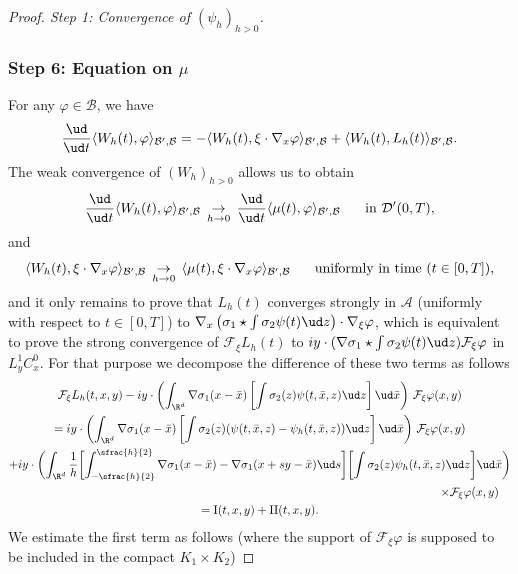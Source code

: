 \begin{proof}[Proof. Step 1: Convergence of $(\psi_{h})_{h>0}$]
\subsubsection*{Step 6: Equation on $\mu$} For any $\varphi\in\mathcal{B}$, we have
\[
\frac{\ud}{\ud t}\langle W_{h}(t),\varphi\rangle_{\mathcal{B}',\mathcal{B}}=-\langle W_{h}(t),\xi\cdot\nabla_{x}\varphi\rangle_{\mathcal{B}',\mathcal{B}}+\langle W_{h}(t),L_{h}(t)\rangle_{\mathcal{B}',\mathcal{B}}.
\]
The weak convergence of $(W_{h})_{h>0}$ allows us to obtain
\[
\frac{\ud}{\ud t}\langle W_{h}(t),\varphi\rangle_{\mathcal{B}',\mathcal{B}}\,\underset{h\to 0}{\to}\,\frac{\ud}{\ud t}\langle \mu(t),\varphi\rangle_{\mathcal{B}',\mathcal{B}} \hspace{0.5cm}\text{ in }\mathcal{D}'(0,T),
\]
and
\[
\langle W_{h}(t),\xi\cdot\nabla_{x}\varphi\rangle_{\mathcal{B}',\mathcal{B}}\,\underset{h\to 0}{\to}\,\langle \mu(t),\xi\cdot\nabla_{x}\varphi\rangle_{\mathcal{B}',\mathcal{B}} \hspace{0.5cm}\text{ uniformly in time }(t\in[0,T]),
\]
and it only remains to prove that $L_{h}(t)$ converges strongly in $\mathcal{A}$ (uniformly with respect to $t\in[0,T]$) to $\nabla_{x}\left(\sigma_{1}\star\int\sigma_{2}\psi(t)\ud z\right)\cdot\nabla_{\xi}\varphi$, which is equivalent to prove the strong convergence of $\mathcal{F}_{\xi}L_{h}(t)$ to $iy\cdot(\nabla\sigma_{1}\star\int\sigma_{2}\psi(t)\ud z)\mathcal{F}_{\xi}\varphi$ in $L_{y}^{1}C_{x}^{0}$. For that purpose we decompose the difference of these two terms as follows
\bgroup
{}
\begin{multline*}
\mathcal{F}_{\xi}L_{h}(t,x,y)-iy\cdot\left(\int_{\R^{d}}\nabla\sigma_{1}(x-\bar{x})\left[\int\sigma_{2}(z)\psi(t,\bar{x},z)\ud z\right]\ud\bar{x}\right)\,\mathcal{F}_{\xi}\varphi(x,y)\\
=iy\cdot\left(\int_{\R^{d}}\nabla\sigma_{1}(x-\bar{x})\left[\int\sigma_{2}(z)(\psi(t,\bar{x},z)-\psi_{h}(t,\bar{x},z))\ud z\right]\ud\bar{x}\right)\,\mathcal{F}_{\xi}\varphi(x,y)\\
+iy\cdot\biggl(\int_{\R^{d}}\frac{1}{h}\biggl[\int_{-\sfrac{h}{2}}^{\sfrac{h}{2}}\nabla\sigma_{1}(x-\bar{x})-\nabla\sigma_{1}(x+sy-\bar{x})\ud s\biggr]\biggl[\int\sigma_{2}(z)\psi_{h}(t,\bar{x},z)\ud z\biggr]\ud\bar{x}\biggr)\\
\shoveright{\times \mathcal{F}_{\xi}\varphi(x,y)}\\
=\mathrm{I}(t,x,y)+\mathrm{II}(t,x,y).
\end{multline*}
\egroup
We estimate the first term as follows (where the support of $\mathcal{F}_{\xi}\varphi$ is supposed to be included in the compact $K_{1}\times K_{2}$)

\end{proof}
